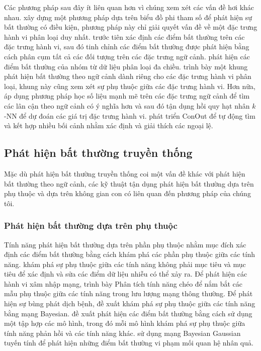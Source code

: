 Các phương pháp sau đây ít liên quan hơn vì chúng xem xét các vấn đề hơi khác nhau. \cite{valko2011conditional} xây dựng một phương pháp dựa trên biểu đồ phi tham số để phát hiện sự bất thường có điều kiện, phương pháp này chỉ giải quyết vấn đề về một đặc trưng hành vi phân loại duy nhất. \cite{hayes2014contextual} trước tiên xác định các điểm bất thường trên các đặc trưng hành vi, sau đó tinh chỉnh các điểm bất thường được phát hiện bằng cách phân cụm tất cả các đối tượng trên các đặc trưng ngữ cảnh. \cite{tang2015mining} phát hiện các điểm bất thường của nhóm từ dữ liệu phân loại đa chiều.  \cite{hong2015multivariate} trình bày một khung phát hiện bất thường theo ngữ cảnh dành riêng cho các đặc trưng hành vi phân loại, khung này cũng xem xét sự phụ thuộc giữa các đặc trưng hành vi. Hơn nữa, \cite{zheng2017contextual} áp dụng phương pháp học số liệu mạnh mẽ trên các đặc trưng ngữ cảnh để tìm các lân cận theo ngữ cảnh có ý nghĩa hơn và sau đó tận dụng hồi quy hạt nhân $k$-NN để dự đoán các giá trị đặc trưng hành vi. \cite{meghanath2018conout} phát triển ConOut để tự động tìm và kết hợp nhiều bối cảnh nhằm xác định và giải thích các ngoại lệ.


\subsection{Phát hiện bất thường truyền thống}Mặc dù phát hiện bất thường truyền thống coi một vấn đề khác với phát hiện bất thường theo ngữ cảnh, các kỹ thuật tận dụng phát hiện bất thường dựa trên phụ thuộc và dựa trên không gian con có liên quan đến phương pháp của chúng tôi.

\subsubsection{Phát hiện bất thường dựa trên phụ thuộc}
Tính năng phát hiện bất thường dựa trên phần phụ thuộc nhằm mục đích xác định các điểm bất thường bằng cách khám phá các phần phụ thuộc giữa các tính năng. \cite{teng1999correcting} khám phá sự phụ thuộc giữa các tính năng không phải mục tiêu và mục tiêu để xác định và sửa các điểm dữ liệu nhiễu có thể xảy ra. Để phát hiện các hành vi xâm nhập mạng, \cite{huang2003cross} trình bày Phân tích tính năng chéo để nắm bắt các mẫu phụ thuộc giữa các tính năng trong lưu lượng mạng thông thường. Để phát hiện sự bùng phát dịch bệnh, \cite{wong2003bayesian} đề xuất khám phá sự phụ thuộc giữa các tính năng bằng mạng Bayesian. \cite{noto2010anomaly} đề xuất phát hiện các điểm bất thường bằng cách sử dụng một tập hợp các mô hình, trong đó mỗi mô hình khám phá sự phụ thuộc giữa tính năng phản hồi và các tính năng khác. \cite{babbar2012mining} sử dụng mạng Bayesian Gaussian tuyến tính để phát hiện những điểm bất thường vi phạm mối quan hệ nhân quả.

